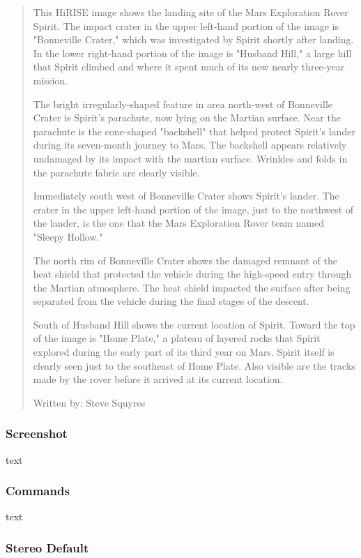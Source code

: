 \begin{quotation}
This HiRISE image shows the landing site of the Mars Exploration Rover
Spirit. The impact crater in the upper left-hand portion of the image
is "Bonneville Crater," which was investigated by Spirit shortly after
landing. In the lower right-hand portion of the image is "Husband
Hill," a large hill that Spirit climbed and where it spent much of its
now nearly three-year mission.

The bright irregularly-shaped feature in area north-west of Bonneville
Crater is Spirit's parachute, now lying on the Martian surface. Near
the parachute is the cone-shaped "backshell" that helped protect
Spirit's lander during its seven-month journey to Mars. The backshell
appears relatively undamaged by its impact with the martian
surface. Wrinkles and folds in the parachute fabric are clearly
visible.

Immediately south west of Bonneville Crater shows Spirit's lander. The
crater in the upper left-hand portion of the image, just to the
northwest of the lander, is the one that the Mars Exploration Rover
team named "Sleepy Hollow."

The north rim of Bonneville Crater shows the damaged remnant of the
heat shield that protected the vehicle during the high-speed entry
through the Martian atmosphere. The heat shield impacted the surface
after being separated from the vehicle during the final stages of the
descent.

South of Husband Hill shows the current location of Spirit. Toward the
top of the image is "Home Plate," a plateau of layered rocks that
Spirit explored during the early part of its third year on
Mars. Spirit itself is clearly seen just to the southeast of Home
Plate. Also visible are the tracks made by the rover before it arrived
at its current location.

Written by: Steve Squyres
\end{quotation}

\subsubsection*{Screenshot}

text

\subsubsection*{Commands}

text

\subsubsection*{Stereo Default}

